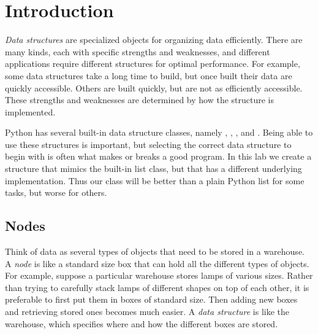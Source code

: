 \label{lab:Python_DataStructures}


\section*{Introduction} %

\emph{Data structures} are specialized objects for organizing data efficiently.
There are many kinds, each with specific strengths and weaknesses, and different applications require different structures for optimal performance.
For example, some data structures take a long time to build, but once built their data are quickly accessible.
Others are built quickly, but are not as efficiently accessible.
These strengths and weaknesses are determined by how the structure is implemented.

Python has several built-in data structure classes, namely , , , and .
Being able to use these structures is important, but selecting the correct data structure to begin with is often what makes or breaks a good program.
In this lab we create a structure that mimics the built-in list class, but that has a different underlying implementation.
Thus our class will be better than a plain Python list for some tasks, but worse for others.

\subsection*{Nodes} %

Think of data as several types of objects that need to be stored in a warehouse.
A \emph{node} is like a standard size box that can hold all the different types of objects.
For example, suppose a particular warehouse stores lamps of various sizes.
Rather than trying to carefully stack lamps of different shapes on top of each other, it is preferable to first put them in boxes of standard size.
Then adding new boxes and retrieving stored ones becomes much easier.
A \emph{data structure} is like the warehouse, which specifies where and how the different boxes are stored.

